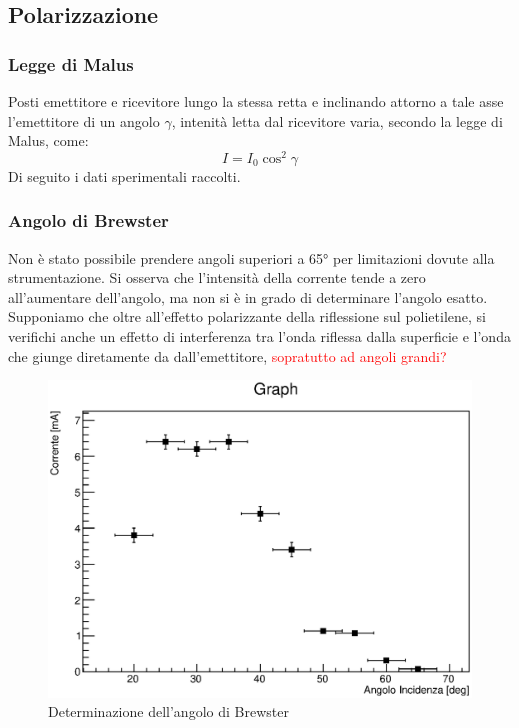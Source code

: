 \subsection{Polarizzazione}
    \subsubsection{Legge di Malus}
        Posti emettitore e ricevitore lungo la stessa retta e inclinando attorno a tale asse l'emettitore di un angolo $\gamma$, intenità letta dal ricevitore varia, secondo la legge di Malus, come:
            $$ I = I_0 \cos^2\gamma $$
        Di seguito i dati sperimentali raccolti.
    
    
    \subsubsection{Angolo di Brewster}
        Non è stato possibile prendere angoli superiori a 65° per limitazioni dovute alla strumentazione. Si osserva che l'intensità della corrente tende a zero all'aumentare dell'angolo, ma non si è in grado di determinare l'angolo esatto.\\
        Supponiamo che oltre all'effetto polarizzante della riflessione sul polietilene, si verifichi anche un effetto di interferenza tra l'onda riflessa dalla superficie e l'onda che giunge diretamente da dall'emettitore, \textcolor{red}{sopratutto ad angoli grandi?}
        \begin{figure}[H]
            \centering
            \includegraphics[scale=0.8]{Grafici/O4_P2_brewster.eps}
            \caption{Determinazione dell'angolo di Brewster}
            \label{fig:O4_P2_brewster}
        \end{figure}

